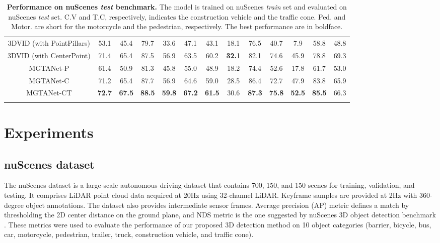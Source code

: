 \documentclass[letterpaper]{article} \usepackage{aaai23}  \usepackage{times}  \usepackage{helvet}  \usepackage{courier}  \usepackage[hyphens]{url}  \usepackage{graphicx} \urlstyle{rm} \def\UrlFont{\rm}  \usepackage{natbib}  \usepackage{caption} \frenchspacing  \setlength{\pdfpagewidth}{8.5in} \usepackage{algorithm}
\begin{document}
\begin{table*}[t]
\begin{center}
\begin{adjustbox}{width=0.99\linewidth}
\begin{tabular}{c || C  C |  C  C  C  C  C  C  C  C  C  C }
\hline

3DVID (with PointPillars) \cite{3dvid}  & 53.1 & 45.4 & 79.7 & 33.6 & 47.1 & 43.1 & 18.1 & 76.5 & 40.7 & 7.9 & 58.8 & 48.8\\
3DVID (with CenterPoint) \cite{3DVID_TPAMI}  & 71.4 & 65.4 & 87.5 & 56.9 & 63.5 & 60.2 & \textbf{32.1} &  82.1 &  74.6 & 45.9 & 78.8 & 69.3\\
MGTANet-P  & 61.4 & 50.9 & 81.3 & 45.8 & 55.0 & 48.9 & 18.2 & 74.4 & 52.6 & 17.8 & 61.7 & 53.0\\
MGTANet-C  & 71.2 & 65.4 & 87.7 & 56.9 & 64.6 & 59.0 & 28.5 & 86.4 & 72.7 & 47.9 & 83.8 & 65.9\\
MGTANet-CT  &  \textbf{72.7} &  \textbf{67.5} &  \textbf{88.5} &  \textbf{59.8} &  \textbf{67.2} &  \textbf{61.5} & 30.6 & \textbf{87.3} & \textbf{75.8} &  \textbf{52.5} &  \textbf{85.5} & 66.3\\

\Xhline{4\arrayrulewidth}

\end{tabular}
\end{adjustbox}
\end{center}

\caption{\textbf{Performance on nuScenes \textit{test} benchmark.} The model is trained on nuScenes \textit{train} set and evaluated on nuScenes \textit{test} set. C.V and T.C, respectively, indicates the construction vehicle and the traffic cone. Ped. and Motor. are short for the motorcycle and the pedestrian, respectively. The best performance are in boldface.}

\label{table:sota}
\end{table*}
\renewcommand{\arraystretch}{1}
 \section{Experiments}
\subsection{nuScenes dataset}
The nuScenes dataset \cite{nuscenes} is a large-scale autonomous driving dataset that contains 700, 150, and 150 scenes for training, validation, and testing. It comprises LiDAR point cloud data acquired at 20Hz using 32-channel LiDAR. Keyframe samples are provided at 2Hz with 360-degree object annotations. The dataset also provides intermediate sensor frames. Average precision (AP) metric defines a match by thresholding the 2D center distance on the ground plane, and NDS metric is the one suggested by nuScenes 3D object detection benchmark \cite{nuscenes}.  These metrics were used to evaluate the performance of our proposed 3D detection method on 10 object categories (barrier, bicycle, bus, car, motorcycle, pedestrian, trailer, truck, construction vehicle, and traffic cone).
\end{document}

